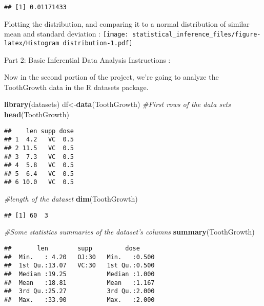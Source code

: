 \documentclass[
]{article}
\newenvironment{Shaded}{\begin{snugshade}}{\end{snugshade}}
\newcommand{\CommentTok}[1]{\textcolor[rgb]{0.56,0.35,0.01}{\textit{#1}}}
\newcommand{\KeywordTok}[1]{\textcolor[rgb]{0.13,0.29,0.53}{\textbf{#1}}}
\newcommand{\NormalTok}[1]{#1}
\begin{document}
\begin{verbatim}
## [1] 0.01171433
\end{verbatim}

Plotting the distribution, and comparing it to a normal distribution of
similar mean and standard deviation :
\texttt{[image: statistical\_inference\_files/figure-latex/Histogram distribution-1.pdf]}

Part 2: Basic Inferential Data Analysis Instructions :

Now in the second portion of the project, we're going to analyze the
ToothGrowth data in the R datasets package.

\begin{Shaded}
\begin{Highlighting}[]
\KeywordTok{library}\NormalTok{(datasets)}
\NormalTok{df<-}\KeywordTok{data}\NormalTok{(ToothGrowth)}
\CommentTok{#First rows of the data sets}
\KeywordTok{head}\NormalTok{(ToothGrowth)}
\end{Highlighting}
\end{Shaded}

\begin{verbatim}
##    len supp dose
## 1  4.2   VC  0.5
## 2 11.5   VC  0.5
## 3  7.3   VC  0.5
## 4  5.8   VC  0.5
## 5  6.4   VC  0.5
## 6 10.0   VC  0.5
\end{verbatim}

\begin{Shaded}
\begin{Highlighting}[]
\CommentTok{#length of the dataset}
\KeywordTok{dim}\NormalTok{(ToothGrowth)}
\end{Highlighting}
\end{Shaded}

\begin{verbatim}
## [1] 60  3
\end{verbatim}

\begin{Shaded}
\begin{Highlighting}[]
\CommentTok{#Some statistics summaries of the dataset's columns}
\KeywordTok{summary}\NormalTok{(ToothGrowth)}
\end{Highlighting}
\end{Shaded}

\begin{verbatim}
##       len        supp         dose      
##  Min.   : 4.20   OJ:30   Min.   :0.500  
##  1st Qu.:13.07   VC:30   1st Qu.:0.500  
##  Median :19.25           Median :1.000  
##  Mean   :18.81           Mean   :1.167  
##  3rd Qu.:25.27           3rd Qu.:2.000  
##  Max.   :33.90           Max.   :2.000
\end{verbatim}
\end{document}
